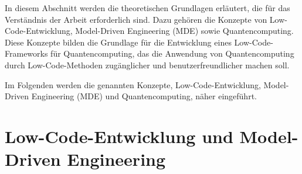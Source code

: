 In diesem Abschnitt werden die theoretischen Grundlagen erläutert, die für das Verständnis der Arbeit 
erforderlich sind. Dazu gehören die Konzepte von Low-Code-Entwicklung, Model-Driven Engineering (MDE) sowie 
Quantencomputing. Diese Konzepte bilden die Grundlage für die Entwicklung eines Low-Code-Frameworks für Quantencomputing, 
das die Anwendung von Quantencomputing durch Low-Code-Methoden zugänglicher und benutzerfreundlicher machen soll.

Im Folgenden werden die genannten Konzepte, Low-Code-Entwicklung, Model-Driven Engineering (MDE) und Quantencomputing, näher eingeführt.


\section{Low-Code-Entwicklung und Model-Driven Engineering}
